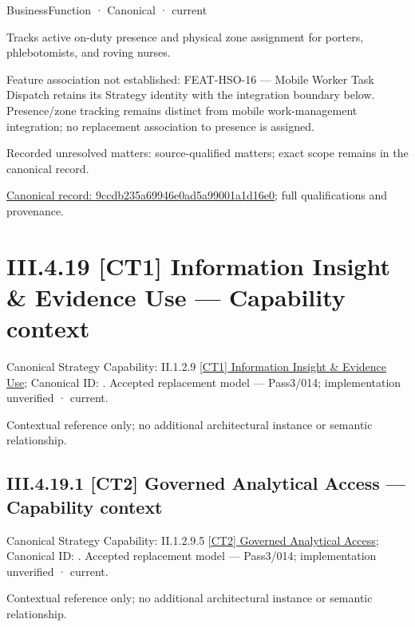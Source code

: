 \label{element:9ccdb235a69946e0ad5a99001a1d16e0}
{\small BusinessFunction · Canonical · current}\par

Tracks active on-duty presence and physical zone assignment for porters, phlebotomists, and roving nurses.



Feature association not established: FEAT-HSO-16 — Mobile Worker Task Dispatch retains its Strategy identity with the integration boundary below. Presence/zone tracking remains distinct from mobile work-management integration; no replacement association to presence is assigned.


{\small Recorded unresolved matters: source-qualified matters; exact scope remains in the canonical record.}\par
{\footnotesize \href{../../../../../../../continuum/business/business-function/9ccdb235a69946e0ad5a99001a1d16e0.md}{Canonical record: 9ccdb235a69946e0ad5a99001a1d16e0}; full qualifications and provenance.}\par
\section*{III.4.19 [CT1] Information Insight \& Evidence Use — Capability context}
\label{navigation:III.4.19}

{\small Canonical Strategy Capability: II.1.2.9 \hyperref[element:73b06d3d6f8f4dc0a7f9f7d500c0aed4]{[CT1] Information Insight \& Evidence Use}; Canonical ID: \texttt{}. Accepted replacement model — Pass3/014; implementation unverified · current.}\par
Contextual reference only; no additional architectural instance or semantic relationship.\par
\subsection*{III.4.19.1 [CT2] Governed Analytical Access — Capability context}
\label{navigation:III.4.19.1}

{\small Canonical Strategy Capability: II.1.2.9.5 \hyperref[element:262a67d8e3fc4a4abfc5a014af89479c]{[CT2] Governed Analytical Access}; Canonical ID: \texttt{}. Accepted replacement model — Pass3/014; implementation unverified · current.}\par
Contextual reference only; no additional architectural instance or semantic relationship.\par
